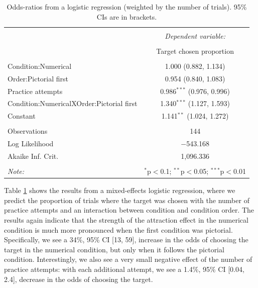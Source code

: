\documentclass[11pt,a4paper]{article}
\begin{document}
\begin{table}[!htbp] \centering 
\captionsetup{justification=centering}
  \caption{Odds-ratios from a logistic regression (weighted by the number of trials). 95\% CIs are in brackets.} 
  \label{mixedeff} 
\begin{tabular}{@{\extracolsep{5pt}}lc} 
\\[-1.8ex]\hline 
\hline \\[-1.8ex] 
 & \multicolumn{1}{c}{\textit{Dependent variable:}} \\ 
\cline{2-2} 
\\[-1.8ex] & Target chosen proportion \\ 
\hline \\[-1.8ex] 
 Condition:Numerical & 1.000 (0.882, 1.134) \\ 
  Order:Pictorial first & 0.954 (0.840, 1.083) \\ 
  Practice attempts & 0.986$^{***}$ (0.976, 0.996) \\ 
  Condition:NumericalXOrder:Pictorial first & 1.340$^{***}$ (1.127, 1.593) \\ 
  Constant & 1.141$^{**}$ (1.024, 1.272) \\ 
 \hline \\[-1.8ex] 
Observations & 144 \\ 
Log Likelihood & $-$543.168 \\ 
Akaike Inf. Crit. & 1,096.336 \\ 
\hline 
\hline \\[-1.8ex] 
\textit{Note:}  & \multicolumn{1}{r}{$^{*}$p$<$0.1; $^{**}$p$<$0.05; $^{***}$p$<$0.01} \\ 
\end{tabular} 
\end{table} 


Table \ref{mixedeff} shows the results from a  mixed-effects logistic regression, where we predict the proportion of trials where the target was chosen with the number of practice attempts and an interaction between condition and condition order.  The results again indicate that the strength of the attraction effect in the numerical condition is much more pronounced when the first condition was pictorial. Specifically, we see a 34\%, 95\% CI [13, 59], increase in the odds of choosing the target in the numerical condition, but only when it follows the pictorial condition. Interestingly, we also see a very small negative effect of the number of practice attempts: with each additional attempt, we see a 1.4\%, 95\% CI [0.04, 2.4], decrease in the odds of choosing the target.
\end{document}
